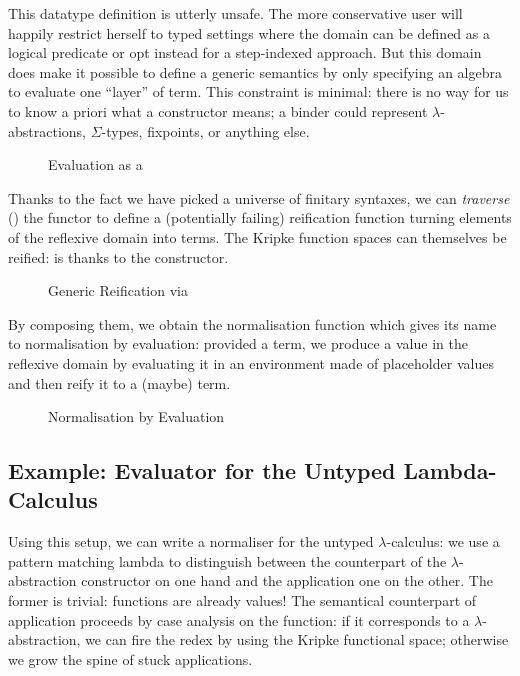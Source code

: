 This datatype definition is utterly unsafe. The more conservative user will happily
restrict herself to typed settings where the domain can be defined as a logical
predicate or opt instead for a step-indexed approach. But this domain does make it
possible to define a generic  semantics by only specifying an algebra to
evaluate one ``layer'' of term. This constraint is minimal: there is no way for
us to know a priori what a constructor means; a binder could represent
$\lambda$-abstractions, $\Sigma$-types, fixpoints, or anything else.

\begin{figure}[h]
\caption{Evaluation as a }
\end{figure}

Thanks to the fact we have picked a universe of finitary syntaxes, we can
\emph{traverse} (\cite{mcbride_paterson_2008}) the functor to define a
(potentially failing) reification function turning elements of the reflexive
domain into terms. The Kripke function spaces can themselves be reified:
 is  thanks to the  constructor.

\begin{figure}[h]
\caption{Generic Reification via }
\end{figure}

By composing them, we obtain the normalisation function which gives its name
to normalisation by evaluation: provided a term, we produce a value in the
reflexive domain by evaluating it in an environment made of placeholder values
and then reify it to a (maybe) term.

\begin{figure}[h]
\caption{Normalisation by Evaluation}
\end{figure}

\subsection{Example: Evaluator for the Untyped Lambda-Calculus}

Using this setup, we can write a normaliser for the untyped $\lambda$-calculus:
we use a pattern matching lambda to distinguish between the counterpart of the
$\lambda$-abstraction constructor on one hand and the application one on the other.
The former is trivial: functions are already values! The semantical counterpart of
application proceeds by case analysis on the function: if it corresponds
to a $\lambda$-abstraction, we can fire the redex by using the Kripke functional space;
otherwise we grow the spine of stuck applications.

